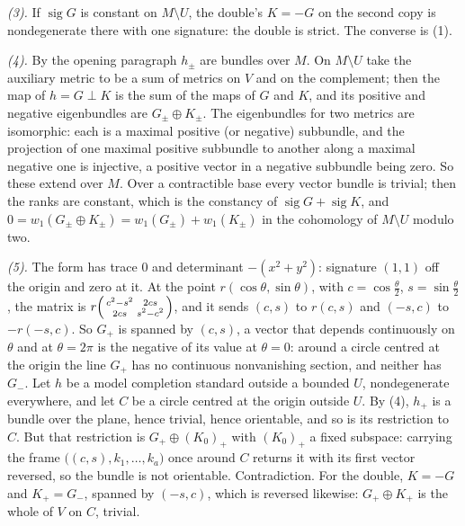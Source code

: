 \emph{(3).} If $\operatorname{sig} G$ is constant on $M \setminus U$, the double's $K = -G$ on the second copy is nondegenerate there with one signature: the double is strict. The converse is (1).

\emph{(4).} By the opening paragraph $h_{\pm}$ are bundles over $M$. On $M \setminus U$ take the auxiliary metric to be a sum of metrics on $V$ and on the complement; then the map of $h = G \perp K$ is the sum of the maps of $G$ and $K$, and its positive and negative eigenbundles are $G_{\pm} \oplus K_{\pm}$. The eigenbundles for two metrics are isomorphic: each is a maximal positive (or negative) subbundle, and the projection of one maximal positive subbundle to another along a maximal negative one is injective, a positive vector in a negative subbundle being zero. So these extend over $M$. Over a contractible base every vector bundle is trivial; then the ranks are constant, which is the constancy of $\operatorname{sig} G + \operatorname{sig} K$, and $0 = w_{1}(G_{\pm} \oplus K_{\pm}) = w_{1}(G_{\pm}) + w_{1}(K_{\pm})$ in the cohomology of $M \setminus U$ modulo two.

\emph{(5).} The form has trace $0$ and determinant $-(x^{2} + y^{2})$: signature $(1,1)$ off the origin and zero at it. At the point $r(\cos\theta, \sin\theta)$, with $c = \cos\tfrac\theta2$, $s = \sin\tfrac\theta2$, the matrix is $r\begin{psmallmatrix} c^{2} - s^{2} & 2cs \\ 2cs & s^{2} - c^{2}\end{psmallmatrix}$, and it sends $(c,s)$ to $r(c,s)$ and $(-s,c)$ to $-r(-s,c)$. So $G_{+}$ is spanned by $(c,s)$, a vector that depends continuously on $\theta$ and at $\theta = 2\pi$ is the negative of its value at $\theta = 0$: around a circle centred at the origin the line $G_{+}$ has no continuous nonvanishing section, and neither has $G_{-}$. Let $h$ be a model completion standard outside a bounded $U$, nondegenerate everywhere, and let $C$ be a circle centred at the origin outside $U$. By (4), $h_{+}$ is a bundle over the plane, hence trivial, hence orientable, and so is its restriction to $C$. But that restriction is $G_{+} \oplus (K_{0})_{+}$ with $(K_{0})_{+}$ a fixed subspace: carrying the frame $\bigl((c,s), k_{1}, \dots, k_{a}\bigr)$ once around $C$ returns it with its first vector reversed, so the bundle is not orientable. Contradiction. For the double, $K = -G$ and $K_{+} = G_{-}$, spanned by $(-s,c)$, which is reversed likewise: $G_{+} \oplus K_{+}$ is the whole of $V$ on $C$, trivial.

